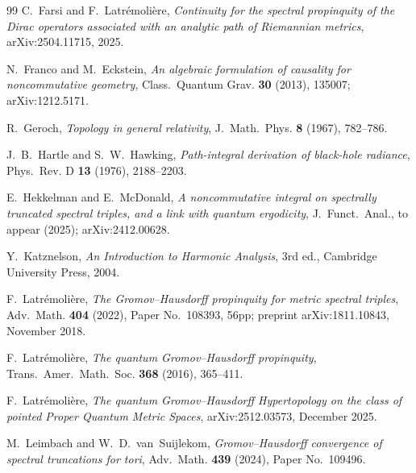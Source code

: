 \documentclass[11pt,a4paper]{article}
\theoremstyle{plain}
\theoremstyle{definition}
\begin{document}
\begin{thebibliography}{99}
C.~Farsi and F.~Latr\'emoli\`ere,
\newblock \emph{Continuity for the spectral propinquity of the Dirac
operators associated with an analytic path of Riemannian metrics},
\newblock arXiv:2504.11715, 2025.

N.~Franco and M.~Eckstein,
\newblock \emph{An algebraic formulation of causality for
noncommutative geometry},
\newblock Class.~Quantum Grav. \textbf{30} (2013), 135007;
\newblock arXiv:1212.5171.

R.~Geroch,
\newblock \emph{Topology in general relativity},
\newblock J.~Math.~Phys. \textbf{8} (1967), 782--786.

J.~B.~Hartle and S.~W.~Hawking,
\newblock \emph{Path-integral derivation of black-hole radiance},
\newblock Phys.~Rev. D \textbf{13} (1976), 2188--2203.


E.~Hekkelman and E.~McDonald,
\newblock \emph{A noncommutative integral on spectrally truncated
spectral triples, and a link with quantum ergodicity},
\newblock J.~Funct.~Anal., to appear (2025);
\newblock arXiv:2412.00628.

Y.~Katznelson,
\newblock \emph{An Introduction to Harmonic Analysis},
\newblock 3rd ed., Cambridge University Press, 2004.

F.~Latr\'emoli\`ere,
\newblock \emph{The Gromov--Hausdorff propinquity for metric spectral
triples},
\newblock Adv.~Math. \textbf{404} (2022), Paper No.~108393, 56pp;
\newblock preprint arXiv:1811.10843, November 2018.

F.~Latr\'emoli\`ere,
\newblock \emph{The quantum Gromov--Hausdorff propinquity},
\newblock Trans.~Amer.~Math.~Soc. \textbf{368} (2016), 365--411.

F.~Latr\'emoli\`ere,
\newblock \emph{The quantum Gromov--Hausdorff Hypertopology on the
class of pointed Proper Quantum Metric Spaces},
\newblock arXiv:2512.03573, December 2025.

M.~Leimbach and W.~D.~van~Suijlekom,
\newblock \emph{Gromov--Hausdorff convergence of spectral truncations
for tori},
\newblock Adv.~Math. \textbf{439} (2024), Paper No.~109496.


\end{thebibliography}
\end{document}
